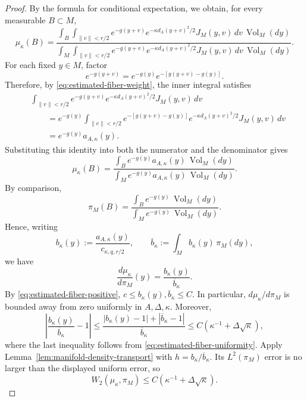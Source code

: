 \documentclass{article}
\newcommand{\Vol}{\operatorname{Vol}}
\numberwithin{equation}{section}
\begin{document}
\begin{proof}
{By the formula for conditional expectation, we obtain, for every measurable $B\subset M$,
}
\[
 \mu_\kappa(B)
 =\frac{
 \displaystyle\int_B\int_{\lVert v\rVert<r/2}
 e^{-g(y+v)}e^{-\kappa d_A(y+v)^2/2}J_M(y,v)
 \,dv\,\Vol_M(dy)}{
 \displaystyle\int_M\int_{\lVert v\rVert<r/2}
 e^{-g(y+v)}e^{-\kappa d_A(y+v)^2/2}J_M(y,v)
 \,dv\,\Vol_M(dy)}.
\]
{\color{black}
For each fixed $y\in M$, factor
\[
 e^{-g(y+v)}=e^{-g(y)}e^{-[g(y+v)-g(y)]}.
\]
}
Therefore, by \eqref{eq:estimated-fiber-weight}, the inner integral satisfies
\begin{align*}
 &\int_{\lVert v\rVert<r/2}
 e^{-g(y+v)}e^{-\kappa d_A(y+v)^2/2}J_M(y,v)\,dv\\
 &\qquad=e^{-g(y)}\int_{\lVert v\rVert<r/2}
 e^{-[g(y+v)-g(y)]}e^{-\kappa d_A(y+v)^2/2}
 J_M(y,v)\,dv\\
 &\qquad=e^{-g(y)}a_{A,\kappa}(y).
\end{align*}
{\color{black}
Substituting this identity into both the numerator and the denominator gives
}
\[
 \mu_\kappa(B)
 =\frac{\displaystyle\int_B e^{-g(y)}a_{A,\kappa}(y)\,\Vol_M(dy)}
 {\displaystyle\int_M e^{-g(y)}a_{A,\kappa}(y)\,\Vol_M(dy)}.
\]
{\color{black}
By comparison,
\[
 \pi_M(B)
 =\frac{\displaystyle\int_B e^{-g(y)}\,\Vol_M(dy)}
 {\displaystyle\int_M e^{-g(y)}\,\Vol_M(dy)}.
\]
}
Hence, writing
\[
 b_\kappa(y):=\frac{a_{A,\kappa}(y)}{c_{\kappa,q,r/2}},
 \qquad
 \overline b_\kappa:=\int_M b_\kappa(y)\,\pi_M(dy),
\]
{\color{black}
we have
\[
 \frac{d\mu_\kappa}{d\pi_M}(y)
 =\frac{b_\kappa(y)}{\overline b_\kappa}.
\]
}
By \eqref{eq:estimated-fiber-positive},
$c\le b_\kappa(y),\overline b_\kappa\le C$.
In particular, $d\mu_\kappa/d\pi_M$ is bounded away from zero uniformly
in $A,\Delta,\kappa$. Moreover,
\[
 \left|
 \frac{b_\kappa(y)}{\overline b_\kappa}-1
 \right|
 \le
 \frac{|b_\kappa(y)-1|+|\overline b_\kappa-1|}
 {\overline b_\kappa}
 \le C\left(\kappa^{-1}+\Delta\sqrt\kappa\right),
\]
where the last inequality follows from
\eqref{eq:estimated-fiber-uniformity}.
Apply Lemma~\ref{lem:manifold-density-transport} with
$h=b_\kappa/\overline b_\kappa$.
Its $L^2(\pi_M)$ error is no larger than the displayed uniform error,
so
\begin{equation}
 W_2(\mu_\kappa,\pi_M)
 \le C\left(\kappa^{-1}+\Delta\sqrt\kappa\right).
\label{eq:projected-marginal}
\end{equation}


\end{proof}
\end{document}

